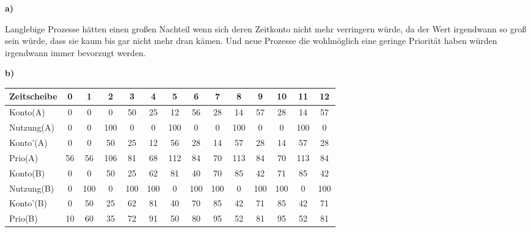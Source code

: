 \documentclass{ti2}
\begin{document}
\textbf{a)}

Langlebige Prozesse hätten einen großen Nachteil wenn sich deren Zeitkonto nicht mehr verringern würde, da der Wert irgendwann so groß sein würde, dass sie kaum bis gar nicht mehr dran kämen. Und neue Prozesse die wohlmöglich eine geringe Priorität haben würden irgendwann immer bevorzugt werden.

\newpage
\textbf{b)}

\begin{tabular}{|p{}|| c | c | c | c | c | c | c | c | c | c | c | c | c |}
\hline
Zeitscheibe &  0 & 1 & 2 & 3 & 4 & 5 & 6 & 7 & 8 & 9 & 10 & 11 & 12  \\
\hline
\hline
Konto(A)  &  0 & 0 & \cellcolor{green}0 & 50 & 25 &\cellcolor{green} 12 & 56 & 28 & \cellcolor{green}14 & 57 & 28 & \cellcolor{green}14 & 57  \\
\hline
Nutzung(A)  &  0 & 0 & \cellcolor{green}100 & 0 & 0 & \cellcolor{green}100 & 0 & 0 & \cellcolor{green}100 & 0 & 0 & \cellcolor{green}100 & 0  \\
\hline
Konto'(A)  &  0 & 0 &\cellcolor{green} 50 & 25 & 12 & \cellcolor{green}56 & 28 & 14 & \cellcolor{green}57 & 28 & 14 & \cellcolor{green}57 & 28  \\
\hline
Prio(A)  &  56 & 56 & \cellcolor{green}106 & 81 & 68 &\cellcolor{green} 112 & 84 & 70 & \cellcolor{green}113 & 84 & 70 & \cellcolor{green}113 & 84  \\
\hline
\hline
Konto(B)  &  0 & \cellcolor{green}0 & 50 &\cellcolor{green} 25 & \cellcolor{green}62 & 81 & \cellcolor{green}40 & \cellcolor{green}70 & 85 & \cellcolor{green}42 & \cellcolor{green}71 & 85 & \cellcolor{green}42  \\
\hline
Nutzung(B)  &  0 & \cellcolor{green}100 & 0 & \cellcolor{green}100 & \cellcolor{green}100 & 0 & \cellcolor{green}100 & \cellcolor{green}100 & 0 & \cellcolor{green}100 & \cellcolor{green}100 & 0 & \cellcolor{green}100  \\
\hline
Konto'(B)  &  0 & \cellcolor{green}50 & 25 &\cellcolor{green} 62 &\cellcolor{green} 81 & 40 &\cellcolor{green} 70 &\cellcolor{green} 85 & 42 &\cellcolor{green} 71 & \cellcolor{green}85 & 42 & \cellcolor{green}71  \\
\hline
Prio(B)  & 10 & \cellcolor{green}60 & 35 & \cellcolor{green}72 & \cellcolor{green}91 & 50 & \cellcolor{green}80 & \cellcolor{green}95 & 52 & \cellcolor{green}81 & \cellcolor{green}95 & 52 & \cellcolor{green}81  \\
\hline
\end{tabular}
\end{document}
